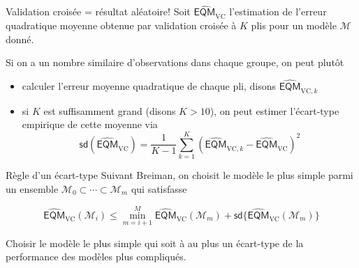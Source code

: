 \documentclass[
  ignorenonframetext,
]{beamer}
\providecommand{\tightlist}{%
  \setlength{\itemsep}{0pt}\setlength{\parskip}{0pt}}\usepackage{longtable,booktabs,array}
\begin{document}
\begin{frame}{Validation croisée = résultat aléatoire!}
\protect\hypertarget{validation-croisuxe9e-ruxe9sultat-aluxe9atoire}{}
Soit \(\widehat{\mathsf{EQM}}_{\text{VC}}\) l'estimation de l'erreur
quadratique moyenne obtenue par validation croisée à \(K\) plis pour un
modèle \(\mathcal{M}\) donné.

Si on a un nombre similaire d'observations dans chaque groupe, on peut
plutôt

\begin{itemize}
\tightlist
\item
  calculer l'erreur moyenne quadratique de chaque pli, disons
  \(\widehat{\mathsf{EQM}}_{\text{VC}, k}\)
\item
  si \(K\) est suffisamment grand (disons \(K>10\)), on peut estimer
  l'écart-type empirique de cette moyenne via
  \[ \mathsf{sd}(\widehat{\mathsf{EQM}}_{\text{VC}}) = \frac{1}{K-1} \sum_{k=1}^{K} (\widehat{\mathsf{EQM}}_{\text{VC}, k}-\widehat{\mathsf{EQM}}_{\text{VC}})^2\]
\end{itemize}
\end{frame}

\begin{frame}{Règle d'un écart-type}
\protect\hypertarget{ruxe8gle-dun-uxe9cart-type}{}
Suivant Breiman, on choisit le modèle le plus simple parmi un ensemble
\(\mathcal{M}_0 \subset\cdots \subset \mathcal{M}_m\) qui satisfasse

\[\widehat{\mathsf{EQM}}_{\text{VC}}(\mathcal{M}_i) \leq \min_{m = i+1}^M \widehat{\mathsf{EQM}}_{\text{VC}}(\mathcal{M}_m) + \mathsf{sd}\{\widehat{\mathsf{EQM}}_{\text{VC}}(\mathcal{M}_m)\}\]

Choisir le modèle le plus simple qui soit à au plus un écart-type de la
performance des modèles plus compliqués.
\end{frame}
\end{document}
